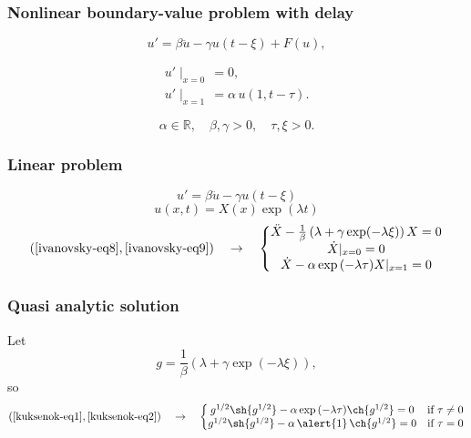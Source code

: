 \documentclass[fullscreen=true, unicode, bookmarks=false]{beamer}
\begin{document}
\begin{frame}
\frametitle{ Nonlinear boundary-value problem with delay}
 
\begin{equation}\label{ivanovsky-eq8}
	u' = \beta \ddot{u} - \gamma u(t - \xi) + F(u),
\end{equation}	

\begin{gather}\label{ivanovsky-eq9}	
	u'\mid_{x=0} \, = 0, \\
	u'\mid_{x=1} \, = \alpha\,u(1, t-\tau). \nonumber
\end{gather}

$$ \alpha \in \mathbb{R}, \quad \beta, \gamma > 0, \quad \tau,\xi> 0. $$

\end{frame}
\begin{frame}
\frametitle{Linear problem}
\begin{equation}
	u' = \beta \ddot{u} - \gamma u(t - \xi)
\end{equation}
\begin{equation}
	u(x,t) = X(x) \exp(\lambda t)
\end{equation}
\begin{equation}\label{kuksenok-eq1}
(\ref{ivanovsky-eq8}, \ref{ivanovsky-eq9}) \quad \rightarrow \quad
\left\{
\begin{matrix}
    \ddot{X}-\frac{1}{\beta}\left( \lambda + \gamma  \exp(-\lambda \xi) \right) X = 0\\
    \dot{X}|_{x=0}=0\\
    \dot{X} - \alpha \exp{(-\lambda \tau)} X |_{x=1} = 0
\end{matrix}
\right.
\end{equation}
\end{frame}
\begin{frame}
\frametitle{Quasi analytic solution}
Let 
\begin{equation}\label{kuksenok-eq2}
g = \frac{1}{\beta}\left( \lambda + \gamma  \exp(-\lambda \xi) \right),
\end{equation}
so
\begin{equation}\label{kuksenok-eq3}
(\ref{kuksenok-eq1}, \ref{kuksenok-eq2}) \quad \rightarrow \quad
\left\{
\begin{matrix}
    g^{1/2}\sh{g^{1/2}}-\alpha \exp{(-\lambda \tau)} \ch{g^{1/2}} = 0 & \mbox{if } \tau \neq 0 \\
    g^{1/2}\sh{g^{1/2}}-\alpha \, \alert{1} \, \ch{g^{1/2}} = 0 & \mbox{if } \tau = 0
\end{matrix}
\right.
\end{equation}
\end{frame}
\end{document}
